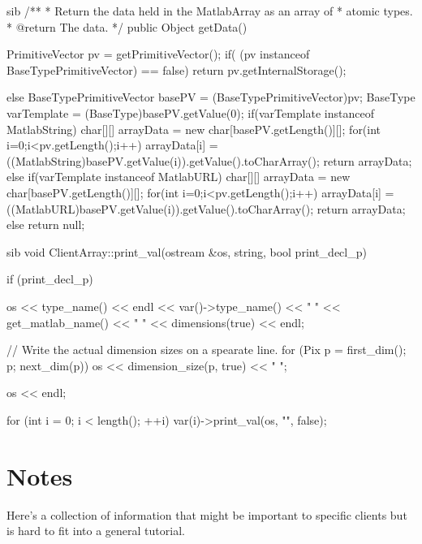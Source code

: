 \documentclass{dods-paper}
\begin{document}
\begin{vcode}{sib}
    /** 
     * Return the data held in the MatlabArray as an array of 
     * atomic types.
     * @return The data.
     */
    public Object getData() {
        PrimitiveVector pv = getPrimitiveVector();
        if( (pv instanceof BaseTypePrimitiveVector) == false) 
            return pv.getInternalStorage();
        
        else {
            BaseTypePrimitiveVector basePV = (BaseTypePrimitiveVector)pv;
            BaseType varTemplate = (BaseType)basePV.getValue(0);
            if(varTemplate instanceof MatlabString) {
                char[][] arrayData = new char[basePV.getLength()][];
                for(int i=0;i<pv.getLength();i++) {
                    arrayData[i] = ((MatlabString)basePV.getValue(i)).getValue().toCharArray();
                }
                return arrayData;
            }
            else if(varTemplate instanceof MatlabURL) {
                char[][] arrayData = new char[basePV.getLength()][];
                for(int i=0;i<pv.getLength();i++) {
                    arrayData[i] = ((MatlabURL)basePV.getValue(i)).getValue().toCharArray();
                }
                return arrayData;
            }
            else return null;
        }
    }
\end{vcode}


\begin{vcode}{sib}
void
ClientArray::print_val(ostream &os, string, bool print_decl_p)
{
    if (print_decl_p) {
        os << type_name() << endl << var()->type_name() << " " 
           << get_matlab_name() << " " << dimensions(true)
           << endl;

        // Write the actual dimension sizes on a spearate line.
        for (Pix p = first_dim(); p; next_dim(p))
            os << dimension_size(p, true) << " ";

        os << endl;
    }

    for (int i = 0; i < length(); ++i)
        var(i)->print_val(os, "", false);
}    
\end{vcode}


\section{Notes}

Here's a collection of information that might be important to specific
clients but is hard to fit into a general tutorial.
\end{document}
